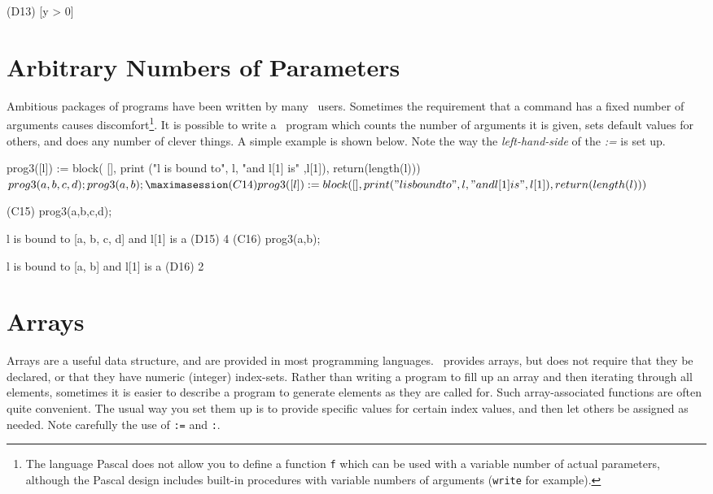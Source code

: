 (D13)                               [y > 0]
\endmaximasession

\section{Arbitrary Numbers of Parameters}

Ambitious packages of programs have been written by many
\Max\
users.
Sometimes the requirement that a command has a fixed number of arguments
causes discomfort\footnote{The language Pascal does not allow you to define
a function {\tt f} which can
be used with a variable number of actual parameters, although
the Pascal design includes built-in procedures with variable numbers of
arguments ({\tt write} for example).}.
It is possible to write a \Max\ program which counts the
number of arguments it is given, sets default values for others, and
does any number of clever things. A simple example is shown below. Note
the way the {\it left-hand-side} of the {\it :=} is set up.

\beginmaximasession
prog3([l]) := block( [],
             print ("l is bound to", l, "and l[1] is" ,l[1]),
             return(length(l)))$
prog3(a,b,c,d);
prog3(a,b);
\maximasession
(C14) prog3([l]) := block( [],
             print ("l is bound to", l, "and l[1] is" ,l[1]),
             return(length(l)))$

(C15) prog3(a,b,c,d);

l is bound to [a, b, c, d] and l[1] is a 
(D15)                                  4
(C16) prog3(a,b);

l is bound to [a, b] and l[1] is a 
(D16)                                  2
\endmaximasession

\section{Arrays}

Arrays are a useful data structure, and are provided in most programming languages. 
\Max\ provides arrays, but does not require that they be declared, or that
they have numeric (integer) index-sets. 
Rather than writing a program to fill up an array and then iterating
through all elements, sometimes it is easier to describe a program
to generate elements as they are called for.  Such array-associated
functions are often quite convenient.  The usual
way you set them up is to provide specific values for certain
index values, and then let others be assigned as needed.  
Note carefully the use of {\tt :=} and {\tt :}.

